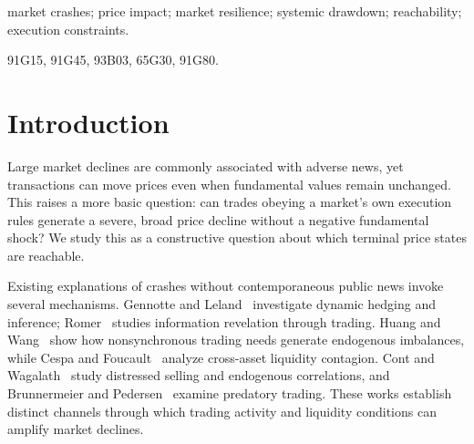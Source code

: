 \documentclass[review,hidelinks,onefignum,onetabnum]{siamonline250211}
\begin{document}
\raggedbottom
\maketitle
\begin{abstract}
Severe systemic price declines are possible in an idealized market even when fundamentals remain fixed. We establish this result constructively in a multiasset model with resilient price impact, paired-dollar execution, and zero terminal executed-dollar balances for every asset. A response-adapted price coordinate transforms executed-dollar transfers into additive displacements, revealing a conservation law during trading and its interaction with resilience. Using this framework, we construct a ten-asset path in which all prices fall by 50\%, and a second family in which nine assets incur arbitrarily severe logarithmic losses under uniform finite turnover and inventory bounds. We further establish elasticity-based barriers to systemic drawdowns, a sharp horizon-dependent bound on full-market losses, and quantitative execution-resource constraints. These results demonstrate that admissible trading alone can generate severe systemic price declines in a minimal market without changes in fundamentals.
\end{abstract}

\begin{keywords}market crashes; price impact; market resilience; systemic drawdown; reachability; execution constraints.\end{keywords}
\begin{MSCcodes}91G15, 91G45, 93B03, 65G30, 91G80.\end{MSCcodes}

\section{Introduction}\label{sec:intro}
Large market declines are commonly associated with adverse news, yet transactions can move prices even when fundamental values remain unchanged. This raises a more basic question: can trades obeying a market's own execution rules generate a severe, broad price decline without a negative fundamental shock? We study this as a constructive question about which terminal price states are reachable.

Existing explanations of crashes without contemporaneous public news invoke several mechanisms. Gennotte and Leland~\citep{GennotteLeland1990} investigate dynamic hedging and inference; Romer~\citep{Romer1993} studies information revelation through trading. Huang and Wang~\citep{HuangWang2009} show how nonsynchronous trading needs generate endogenous imbalances, while Cespa and Foucault~\citep{CespaFoucault2014} analyze cross-asset liquidity contagion. Cont and Wagalath~\citep{ContWagalath2013} study distressed selling and endogenous correlations, and Brunnermeier and Pedersen~\citep{BrunnermeierPedersen2005} examine predatory trading. These works establish distinct channels through which trading activity and liquidity conditions can amplify market declines.
\end{document}
